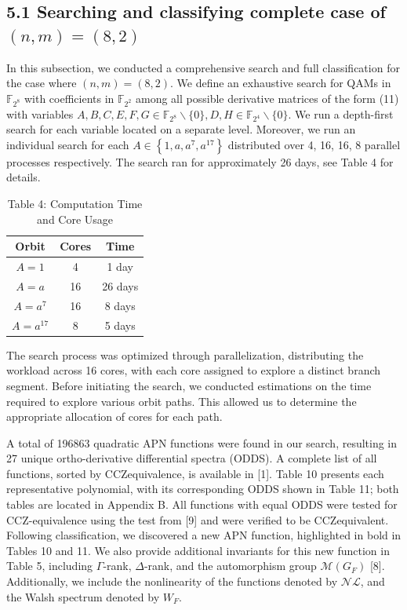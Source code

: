 \documentclass[10pt]{article}
\begin{document}
\subsection*{5.1 Searching and classifying complete case of $(n, m)=(8,2)$}
In this subsection, we conducted a comprehensive search and full classification for the case where $(n, m)=(8,2)$. We define an exhaustive search for QAMs in $\mathbb{F}_{2^{8}}$ with coefficients in $\mathbb{F}_{2^{2}}$ among all possible derivative matrices of the form (11) with variables $A, B, C, E, F, G \in \mathbb{F}_{2^{8}} \backslash\{0\}, D, H \in \mathbb{F}_{2^{4}} \backslash\{0\}$. We run a depth-first search for each variable located on a separate level. Moreover, we run an individual search for each $A \in\left\{1, a, a^{7}, a^{17}\right\}$ distributed over 4, 16, 16, 8 parallel processes respectively. The search ran for approximately 26 days, see Table 4 for details.

\begin{table}[h]
\begin{center}
\begin{tabular}{c|c|c}
Orbit & Cores & Time \\
\hline
$A=1$ & 4 & 1 day \\
$A=a$ & 16 & 26 days \\
$A=a^{7}$ & 16 & 8 days \\
$A=a^{17}$ & 8 & 5 days \\
\end{tabular}
\captionsetup{labelformat=empty}
\caption{Table 4: Computation Time and Core Usage}
\end{center}
\end{table}

The search process was optimized through parallelization, distributing the workload across 16 cores, with each core assigned to explore a distinct branch segment. Before initiating the search, we conducted estimations on the time required to explore various orbit paths. This allowed us to determine the appropriate allocation of cores for each path.

A total of 196863 quadratic APN functions were found in our search, resulting in 27 unique ortho-derivative differential spectra (ODDS). A complete list of all functions, sorted by CCZequivalence, is available in [1]. Table 10 presents each representative polynomial, with its corresponding ODDS shown in Table 11; both tables are located in Appendix B. All functions with equal ODDS were tested for CCZ-equivalence using the test from [9] and were verified to be CCZequivalent. Following classification, we discovered a new APN function, highlighted in bold in Tables 10 and 11. We also provide additional invariants for this new function in Table 5, including $\Gamma$-rank, $\Delta$-rank, and the automorphism group $\mathcal{M}\left(G_{F}\right)$ [8]. Additionally, we include the nonlinearity of the functions denoted by $\mathcal{N} \mathcal{L}$, and the Walsh spectrum denoted by $W_{F}$.
\end{document}
